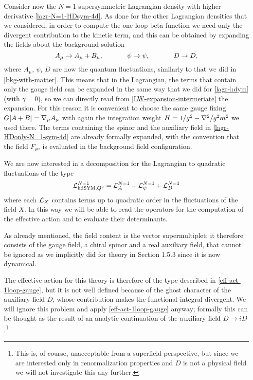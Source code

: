 Consider now the $N=1$ supersymmetric Lagrangian density with higher derivative \eqref{lagr-N=1-HDsym-4d}. As done for the other Lagrangian densities that we considered, in order to compute the one-loop beta function we need only the divergent contribution to the \ym{} kinetic term, and this can be obtained by expanding the fields about the background solution
\begin{equation}\label{N=1-bkg-expansion}
A_\mu \rightarrow A_\mu + B_\mu ,
\hspace{3.5em}
\psi \rightarrow \psi,
\hspace{3.5em}
D \rightarrow D,
\end{equation}
where $A_\mu$, $\psi$, $D$ are now the quantum fluctuations, similarly to that we did in  \eqref{bkg-with-matter}.
This means that in the Lagrangian,
the terms that contain only the gauge field can be expanded in the same way that we did for \eqref{lagr-hdym} (with $\gamma = 0$), so we can directly read from \eqref{LW-expansion-intermeriate} the expansion. For this reason it is convenient to choose the same gauge fixing \( G[A+B] = { \mathcal{\nabla} }_\mu A_\mu \) with again the integration weight $H = 1/g^2 - { \mathcal{\nabla} }^2 /g^2 m^2$ we used there.
The terms containing the spinor and the auxiliary field in \eqref{lagr-HDonly-N=1-sym-4d} are already formally expanded, with the convention that the field $ F_{\rho\sigma} $ is evaluated in the background field configuration.


We are now interested in a decomposition for the Lagrangian to quadratic fluctuations of the type
\begin{equation}
{ \mathcal{L} }^{N=1}_{{ \text{hd} }{ \text{SYM} },Q^2}
	=
{ \mathcal{L} }^{ N = 1 }_A
+
{ \mathcal{L} }^{ N = 1 }_\psi
+
{ \mathcal{L} }^{ N = 1 }_D
\end{equation}
where each ${ \mathcal{L} }_X$ contains terms up to quadratic order in the fluctuations of the field $X$. In this way we will be able to read the operators for the computation of the effective action and to evaluate their determinants.


As already mentioned, the field content is the vector supermultiplet; it therefore consists of the gauge field, a chiral spinor and a real auxiliary field, that cannot be ignored as we implicitly did for \sym{} theory in Section 1.5.3
since it is now dynamical. 


The effective action for this theory is therefore of the type described in \eqref{eff-act-1loop-gauge}, but it is not well defined because of the ghost character of the auxiliary field $D$, whose contribution makes the functional integral divergent. We will ignore this problem and apply \eqref{eff-act-1loop-gauge} anyway; formally this can be thought as the result of an analytic continuation of the auxiliary field $D \rightarrow iD$.\footnote{This is, of course, unacceptable from a superfield perspective, but since we are interested only in renormalization properties and $D$ is not a physical field we will not investigate this any further.}




